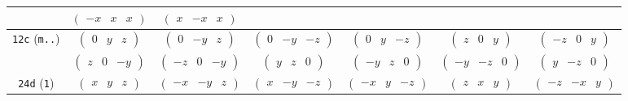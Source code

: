 \documentclass[fleqn,9pt,landscape]{jsarticle}
\begin{document}
\begin{center}
\begin{longtable}{ccccccc}
& $ \begin{pmatrix} - x & x & x \end{pmatrix} $ & $ \begin{pmatrix} x & - x & x \end{pmatrix} $ & $  $ & $  $ & $  $ & $  $ \\ \hline
{\tt 12c} ({\tt m..}) & $ \begin{pmatrix} 0 & y & z \end{pmatrix} $ & $ \begin{pmatrix} 0 & - y & z \end{pmatrix} $ & $ \begin{pmatrix} 0 & - y & - z \end{pmatrix} $ & $ \begin{pmatrix} 0 & y & - z \end{pmatrix} $ & $ \begin{pmatrix} z & 0 & y \end{pmatrix} $ & $ \begin{pmatrix} - z & 0 & y \end{pmatrix} $ \\
& $ \begin{pmatrix} z & 0 & - y \end{pmatrix} $ & $ \begin{pmatrix} - z & 0 & - y \end{pmatrix} $ & $ \begin{pmatrix} y & z & 0 \end{pmatrix} $ & $ \begin{pmatrix} - y & z & 0 \end{pmatrix} $ & $ \begin{pmatrix} - y & - z & 0 \end{pmatrix} $ & $ \begin{pmatrix} y & - z & 0 \end{pmatrix} $ \\ \hline
{\tt 24d} ({\tt 1}) & $ \begin{pmatrix} x & y & z \end{pmatrix} $ & $ \begin{pmatrix} - x & - y & z \end{pmatrix} $ & $ \begin{pmatrix} x & - y & - z \end{pmatrix} $ & $ \begin{pmatrix} - x & y & - z \end{pmatrix} $ & $ \begin{pmatrix} z & x & y \end{pmatrix} $ & $ \begin{pmatrix} - z & - x & y \end{pmatrix} $ \\

\end{longtable}
\end{center}
\end{document}
